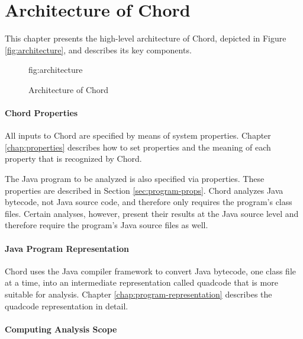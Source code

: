 \chapter{Architecture of Chord}
\label{chap:architecture}

This chapter presents the high-level architecture of Chord, depicted in Figure \ref{fig:architecture}, and describes its key components.

\begin{figure}
\begin{center}
\begin{label}{fig:architecture}
\caption{Architecture of Chord}
\end{label}
\end{center}
\end{figure}

\subsubsection*{Chord Properties}

All inputs to Chord are specified by means of system properties. 
Chapter \ref{chap:properties} describes how to set properties and the meaning of 
each property that is recognized by Chord.

The Java program to be analyzed is also specified via properties.
These properties are described in Section \ref{sec:program-props}.
Chord analyzes Java bytecode, not Java source code, and therefore only requires
the program's class files.  Certain analyses, however, present
their results at the Java source level and therefore require the program's
Java source files as well.

\subsubsection*{Java Program Representation}

Chord uses the  Java compiler framework
to convert Java bytecode, one class file at a time, into an intermediate representation called quadcode
that is more suitable for analysis. Chapter \ref{chap:program-representation}
describes the quadcode representation in detail.

\subsubsection*{Computing Analysis Scope}


